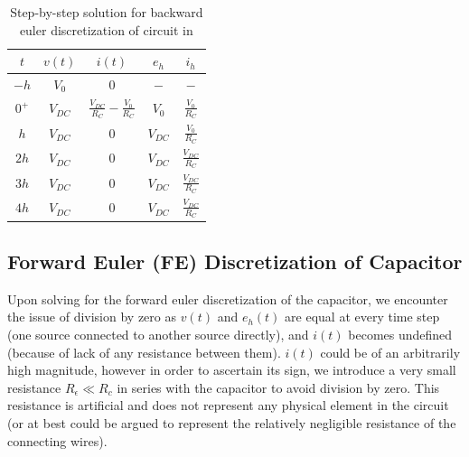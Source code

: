 \begin{table}[h!]
\centering
{}
\renewcommand{\arraystretch}{2.5}
\setlength{\tabcolsep}{12pt}
\begin{tabular}{|c|c|c|c|c|}
\hline
\rowcolor{warmBlue}
	\textbf{\color{white}$t$} & \textbf{\color{white}$v(t)$} & \textbf{\color{white}$i(t)$} & \textbf{\color{white}$e_h$} & \textbf{\color{white}$i_h$} \\[1ex]
\hline
\rowcolor{lightBlue}
    $-h$ & $V_0$ & $0$ & $-$ & $-$ \\[1ex]
\hline
    $0^+$ & $V_{DC}$ & $\displaystyle\frac{V_{DC}}{R_C} - \frac{V_0}{R_C}$ & $V_0$ & $\displaystyle\frac{V_0}{R_C}$ \\[1ex]
\hline
\rowcolor{lightBlue}
    $h$ & $V_{DC}$ & $0$ & $V_{DC}$ & $\displaystyle\frac{V_0}{R_C}$ \\[1ex]
\hline
    $2h$ & $V_{DC}$ & $0$ & $V_{DC}$ & $\displaystyle\frac{V_{DC}}{R_C}$ \\[1ex]
\hline
\rowcolor{lightBlue}
    $3h$ & $V_{DC}$ & $0$ & $V_{DC}$ & $\displaystyle\frac{V_{DC}}{R_C}$ \\[1ex]
\hline
    $4h$ & $V_{DC}$ & $0$ & $V_{DC}$ & $\displaystyle\frac{V_{DC}}{R_C}$ \\[1ex]
\hline
\end{tabular}
\caption{Step-by-step solution for backward euler discretization of circuit in }
\label{tab:be_solution_ckt_a}
\end{table}

\vspace{1em}

\subsection{Forward Euler (FE) Discretization of Capacitor}


Upon solving for the forward euler discretization of the capacitor, we encounter the issue of division by zero as $v(t)$ and $e_h(t)$ are equal at every time step (one source connected to another source directly), and $i(t)$ becomes undefined (because of lack of any resistance between them). $i(t)$ could be of an arbitrarily high magnitude, however in order to ascertain its sign, we introduce a very small resistance \( R_\epsilon \ll R_c\) in series with the capacitor to avoid division by zero. This resistance is artificial and does not represent any physical element in the circuit (or at best could be argued to represent the relatively negligible resistance of the connecting wires).

